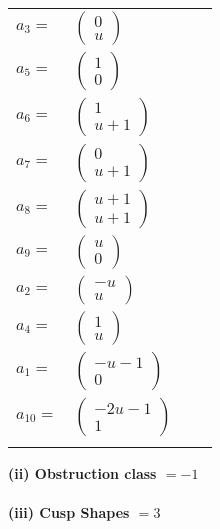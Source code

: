 \documentclass[1p]{elsarticle_modified}
\theoremstyle{definition}
\begin{document}
\begin{tabular}{m{7pt} m{180pt} m{7pt} m{180pt} }
\flushright $a_{3}=$&$\begin{pmatrix}0\\u\end{pmatrix}$ \\
\flushright $a_{5}=$&$\begin{pmatrix}1\\0\end{pmatrix}$ \\
\flushright $a_{6}=$&$\begin{pmatrix}1\\u+1\end{pmatrix}$ \\
\flushright $a_{7}=$&$\begin{pmatrix}0\\u+1\end{pmatrix}$ \\
\flushright $a_{8}=$&$\begin{pmatrix}u+1\\u+1\end{pmatrix}$ \\
\flushright $a_{9}=$&$\begin{pmatrix}u\\0\end{pmatrix}$ \\
\flushright $a_{2}=$&$\begin{pmatrix}- u\\u\end{pmatrix}$ \\
\flushright $a_{4}=$&$\begin{pmatrix}1\\u\end{pmatrix}$ \\
\flushright $a_{1}=$&$\begin{pmatrix}- u-1\\0\end{pmatrix}$ \\
\flushright $a_{10}=$&$\begin{pmatrix}-2 u-1\\1\end{pmatrix}$\\&\end{tabular}
\flushleft \textbf{(ii) Obstruction class $= -1$}\\~\\
\flushleft \textbf{(iii) Cusp Shapes $= 3$}\\~\\
\end{document}
